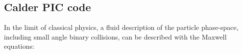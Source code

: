 


\subsection{Calder PIC code}
In the limit of classical physics, a fluid description of the particle phase-space, including small angle binary collisions, can be described with the Maxwell equations:

